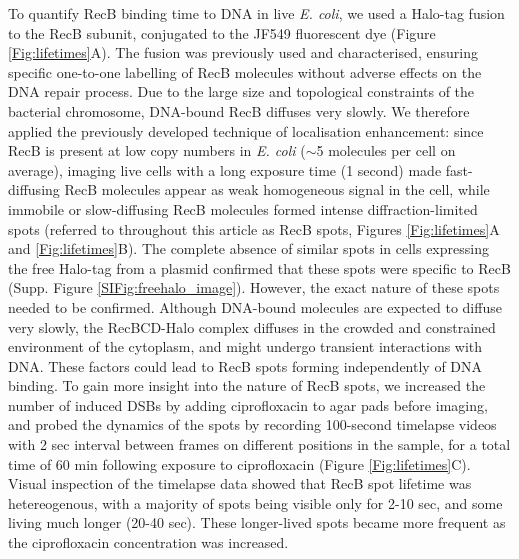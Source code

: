To quantify RecB binding time to DNA in live \textit{E. coli}, we used a Halo-tag fusion to the RecB subunit, conjugated to the JF549 fluorescent dye (Figure \ref{Fig:lifetimes}A). The fusion was previously used and characterised, ensuring specific one-to-one labelling of RecB molecules without adverse effects on the DNA repair process\cite{Lepore2019a,Lepore2023}. Due to the large size and topological constraints of the bacterial chromosome, DNA-bound RecB diffuses very slowly\cite{Lepore2023}. We therefore applied the previously developed technique of localisation enhancement\cite{Yu2006, Elf2007}: since RecB is present at low copy numbers in \textit{E. coli} ($\sim$5 molecules per cell on average\cite{Lepore2019a}), imaging live cells with a long exposure time (1 second) made fast-diffusing RecB molecules appear as weak homogeneous signal in the cell, while immobile or slow-diffusing RecB molecules formed intense diffraction-limited spots (referred to throughout this article as RecB spots, Figures \ref{Fig:lifetimes}A and \ref{Fig:lifetimes}B). The complete absence of similar spots in cells expressing the free Halo-tag from a plasmid confirmed that these spots were specific to RecB (Supp. Figure \ref{SIFig:freehalo_image}). However, the exact nature of these spots needed to be confirmed. Although DNA-bound molecules are expected to diffuse very slowly, the RecBCD-Halo complex diffuses in the crowded and constrained environment of the cytoplasm, and might undergo transient interactions with DNA\cite{Lepore2023}. These factors could lead to RecB spots forming independently of DNA binding. To gain more insight into the nature of RecB spots, we increased the number of induced DSBs by adding ciprofloxacin to agar pads before imaging, and probed the dynamics of the spots by recording 100-second timelapse videos with 2 sec interval between frames on different positions in the sample, for a total time of 60 min following exposure to ciprofloxacin (Figure \ref{Fig:lifetimes}C). Visual inspection of the timelapse data showed that RecB spot lifetime was hetereogenous, with a majority of spots being visible only for 2-10 sec, and some living much longer (20-40 sec). These longer-lived spots became more frequent as the ciprofloxacin concentration was increased.

